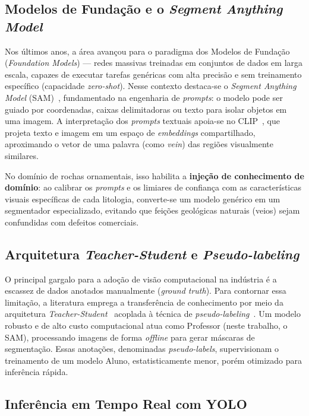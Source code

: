 \documentclass[12pt]{article}
\begin{document}
\subsection{Modelos de Fundação e o \textit{Segment Anything Model}}

Nos últimos anos, a área avançou para o paradigma dos Modelos de Fundação (\textit{Foundation Models}) --- redes massivas treinadas em conjuntos de dados em larga escala, capazes de executar tarefas genéricas com alta precisão e sem treinamento específico (capacidade \textit{zero-shot}). Nesse contexto destaca-se o \textit{Segment Anything Model} (SAM)~\cite{sam_kirillov2023}, fundamentado na engenharia de \textit{prompts}: o modelo pode ser guiado por coordenadas, caixas delimitadoras ou texto para isolar objetos em uma imagem. A interpretação dos \textit{prompts} textuais apoia-se no CLIP~\cite{clip_radford2021}, que projeta texto e imagem em um espaço de \textit{embeddings} compartilhado, aproximando o vetor de uma palavra (como \textit{vein}) das regiões visualmente similares.

No domínio de rochas ornamentais, isso habilita a \textbf{injeção de conhecimento de domínio}: ao calibrar os \textit{prompts} e os limiares de confiança com as características visuais específicas de cada litologia, converte-se um modelo genérico em um segmentador especializado, evitando que feições geológicas naturais (veios) sejam confundidas com defeitos comerciais.

\subsection{Arquitetura \textit{Teacher-Student} e \textit{Pseudo-labeling}}

O principal gargalo para a adoção de visão computacional na indústria é a escassez de dados anotados manualmente (\textit{ground truth}). Para contornar essa limitação, a literatura emprega a transferência de conhecimento por meio da arquitetura \textit{Teacher-Student}~\cite{distill_hinton2015} acoplada à técnica de \textit{pseudo-labeling}~\cite{pseudolabel_lee2013}. Um modelo robusto e de alto custo computacional atua como Professor (neste trabalho, o SAM), processando imagens de forma \textit{offline} para gerar máscaras de segmentação. Essas anotações, denominadas \textit{pseudo-labels}, supervisionam o treinamento de um modelo Aluno, estatisticamente menor, porém otimizado para inferência rápida.

\subsection{Inferência em Tempo Real com YOLO}
\end{document}
